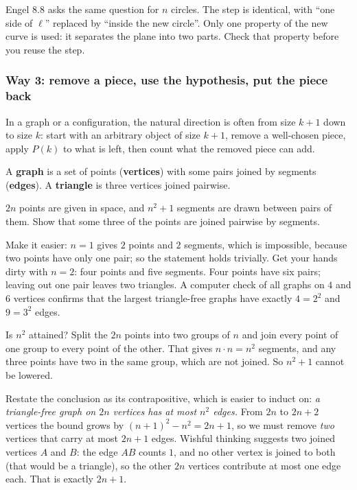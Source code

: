 \documentclass[10pt]{scrartcl}
\begin{document}
\begin{remark*}
  Engel 8.8 asks the same question for $n$ circles. The step is identical, with ``one side of $\ell$'' replaced by ``inside the new circle''. Only one property of the new curve is used: it separates the plane into two parts. Check that property before you reuse the step.
\end{remark*}

\subsubsection*{Way 3: remove a piece, use the hypothesis, put the piece back}
In a graph or a configuration, the natural direction is often from size $k+1$ down to size $k$: start with an arbitrary object of size $k+1$, remove a well-chosen piece, apply $P(k)$ to what is left, then count what the removed piece can add.

\begin{definition*}
  A \textbf{graph} is a set of points (\textbf{vertices}) with some pairs joined by segments (\textbf{edges}). A \textbf{triangle} is three vertices joined pairwise.
\end{definition*}

\begin{example*}
  $2n$ points are given in space, and $n^2 + 1$ segments are drawn between pairs of them. Show that some three of the points are joined pairwise by segments.
\end{example*}

Make it easier: $n = 1$ gives $2$ points and $2$ segments, which is impossible, because two points have only one pair; so the statement holds trivially. Get your hands dirty with $n = 2$: four points and five segments. Four points have six pairs; leaving out one pair leaves two triangles. A computer check of all graphs on $4$ and $6$ vertices confirms that the largest triangle-free graphs have exactly $4 = 2^2$ and $9 = 3^2$ edges.

Is $n^2$ attained? Split the $2n$ points into two groups of $n$ and join every point of one group to every point of the other. That gives $n \cdot n = n^2$ segments, and any three points have two in the same group, which are not joined. So $n^2 + 1$ cannot be lowered.

\begin{ideabox}
  Restate the conclusion as its contrapositive, which is easier to induct on: \emph{a triangle-free graph on $2n$ vertices has at most $n^2$ edges.} From $2n$ to $2n + 2$ vertices the bound grows by $(n+1)^2 - n^2 = 2n + 1$, so we must remove \emph{two} vertices that carry at most $2n+1$ edges. Wishful thinking suggests two joined vertices $A$ and $B$: the edge $AB$ counts $1$, and no other vertex is joined to both (that would be a triangle), so the other $2n$ vertices contribute at most one edge each. That is exactly $2n + 1$.
\end{ideabox}
\end{document}
